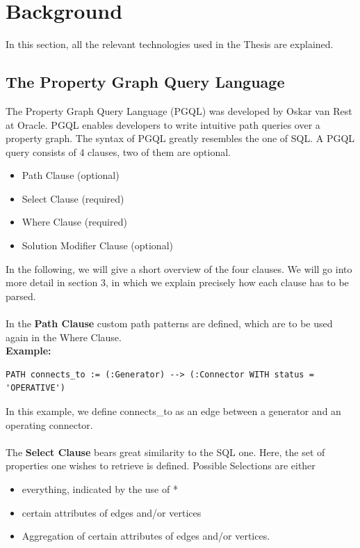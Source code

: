 \documentclass[11pt,singlecolumn]{scrartcl}
\begin{document}

\section{Background}
In this section, all the relevant technologies used in the Thesis are explained.
\subsection{The Property Graph Query Language}

The Property Graph Query Language (PGQL) was developed by Oskar van Rest at Oracle\cite{vanRest:2016}. PGQL enables developers to write intuitive path queries over a property graph. The syntax of PGQL greatly resembles the one of SQL. A PGQL query consists of 4 clauses, two of them are optional.
\begin{itemize} 
\item Path Clause (optional)
\item Select Clause (required)
\item Where Clause (required)
\item Solution Modifier Clause (optional)
\end{itemize}
In the following, we will give a short overview of the four clauses. We will go into more detail in section 3, in which we explain precisely how each clause has to be parsed.\\\\
In the \textbf{Path Clause} custom path patterns are defined, which are to be used again in the Where Clause.\\
\textbf{Example:}
\begin{verbatim}
PATH connects_to := (:Generator) --> (:Connector WITH status = 'OPERATIVE')
 \end{verbatim}
\noindent In this example, we define connects\_to as an edge between a generator and an operating connector.\\\\
The \textbf{Select Clause} bears great similarity to the SQL one. Here, the set of properties one wishes to retrieve is defined. Possible Selections are either\\
\begin{itemize} 
\item everything, indicated by the use of * 
\item certain attributes of edges and/or vertices
\item Aggregation of certain attributes of edges and/or vertices.
\end{itemize}
\end{document}
